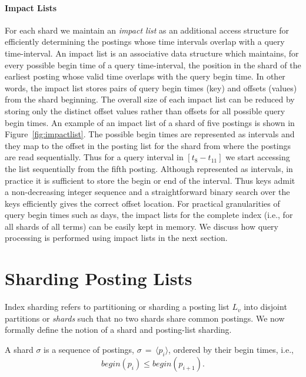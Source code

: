 \paragraph{Impact Lists} For each shard we maintain an \emph{impact list} as an additional access structure for efficiently determining the postings whose time intervals overlap with a query time-interval. An impact list is an associative data structure which maintains, for every possible begin time of a query time-interval, the position in
the shard of the earliest posting whose valid time overlaps with the query begin time. In other words, the impact list stores pairs of query begin times (key) and offsets (values) from the shard beginning. The overall size of each impact list can be reduced by storing only the distinct offset values rather than offsets for all possible query begin times. An example of an impact list of a shard of five postings is shown in Figure~\ref{fig:impactlist}. The possible begin times are represented as intervals and they map to the offset in the posting list for the shard from where the postings are read sequentially. Thus for a query interval in $[t_8 - t_{11}]$ we start accessing the list sequentially from the fifth posting. Although represented as intervals, in practice it is sufficient to store the begin or end of the interval. 
Thus keys admit a non-decreasing integer sequence and a straightforward binary search over the keys efficiently gives the correct offset location. For practical granularities of query begin times such as days, the impact lists for the complete index (i.e., for all shards of all terms) can be easily kept in memory. We discuss how query processing is performed using impact lists in the next section.


\section{Sharding Posting Lists} 
\label{chap:sharding:chap:horizontal_partitioning}
Index sharding refers to partitioning or sharding a posting list $L_v$ into disjoint partitions or \emph{shards} such that no two shards share common postings. We now formally define the notion of a shard and posting-list sharding. 

\begin{definition}[Shard]
A shard $\sigma$ is a sequence of postings, $\sigma \,=\,\langle p_i\rangle$, ordered by their begin times, i.e., 
$$
	begin(p_i) \leq begin(p_{i+1}).
$$ 
\end{definition}

